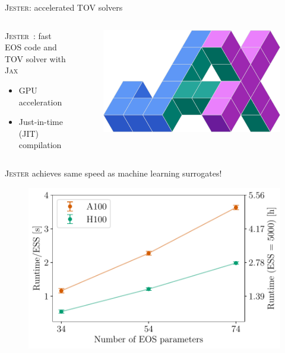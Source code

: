 \documentclass[usenames,dvipsnames,t]{beamer}
\begin{document}
\begin{frame}{\textsc{Jester}: accelerated TOV solvers}
  \def\negx{-3mm}
  \def\x{4mm}
  \def\z{1mm}

  \vspace{\negx}

  \begin{columns}
    \begin{column}{0.80\textwidth}

      \textsc{Jester}~\cite{Wouters:2025zju}: fast EOS code and TOV solver with \textsc{Jax}
      \begin{itemize}
        \item GPU acceleration

        \vspace{\z}

        \item Just-in-time (JIT) compilation

      \end{itemize}
    \end{column}

    \vspace{\x}

    \begin{column}{0.20\textwidth}
      \begin{figure}
        \centering
      \includegraphics[width=0.75\linewidth]{Figures/jax.png}
      \end{figure}
    \end{column}
  \end{columns}

  \begin{tcolorbox}[colback=blue!10, boxrule=0pt]
    \textsc{Jester} achieves same speed as machine learning surrogates!
  \end{tcolorbox}

  \vspace{\negx}

  \begin{figure}
    \centering
    \includegraphics[width=0.60\linewidth]{Figures/scaling_plot.pdf}
  \end{figure}
\end{frame}
\end{document}
